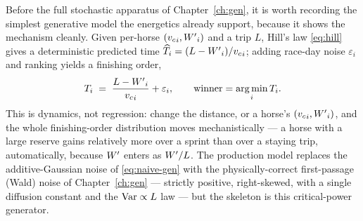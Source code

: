 Before the full stochastic apparatus of Chapter~\ref{ch:gen}, it is worth recording the simplest
generative model the energetics already support, because it shows the mechanism cleanly. Given
per-horse $({v_{c}}_i,{W^{\prime}}_i)$ and a trip $L$, Hill's law \eqref{eq:hill} gives a deterministic
predicted time $\widehat T_i = (L-{W^{\prime}}_i)/{v_{c}}_i$; adding race-day noise $\varepsilon_i$ and ranking
yields a finishing order,
\begin{equation}
  T_i \;=\; \frac{L-{W^{\prime}}_i}{{v_{c}}_i} + \varepsilon_i,
  \qquad
  \text{winner} = \operatorname*{arg\,min}_i T_i .
  \label{eq:naive-gen}
\end{equation}
This is dynamics, not regression: change the distance, or a horse's $({v_{c}}_i,{W^{\prime}}_i)$, and the
whole finishing-order distribution moves mechanistically --- a horse with a large reserve gains
relatively more over a sprint than over a staying trip, automatically, because ${W^{\prime}}$ enters as
${W^{\prime}}/L$. The production model replaces the additive-Gaussian noise of \eqref{eq:naive-gen} with
the physically-correct first-passage (Wald) noise of Chapter~\ref{ch:gen} --- strictly positive,
right-skewed, with a single diffusion constant and the $\operatorname{Var}\propto L$ law --- but the skeleton is
this critical-power generator.
